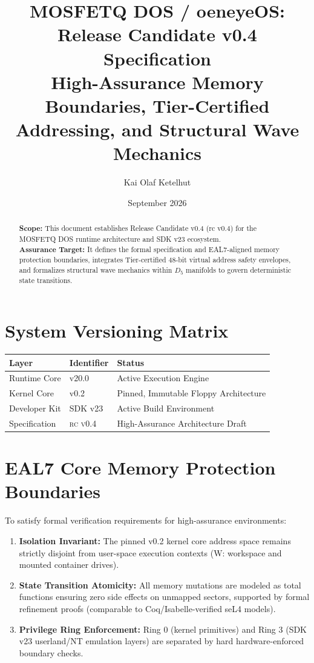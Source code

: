 \documentclass[11pt,a4paper]{article}
\title{MOSFETQ DOS / oeneyeOS: Release Candidate v0.4 Specification \\ \large High-Assurance Memory Boundaries, Tier-Certified Addressing, and Structural Wave Mechanics}
\author{Kai Olaf Ketelhut}
\date{September 2026}
\begin{document}
\maketitle

\begin{abstract}
\noindent \textbf{Scope:} This document establishes Release Candidate v0.4 ($\text{rc v0.4}$) for the MOSFETQ DOS runtime architecture and SDK v23 ecosystem. \\
\textbf{Assurance Target:} It defines the formal specification and EAL7-aligned memory protection boundaries, integrates Tier-certified 48-bit virtual address safety envelopes, and formalizes structural wave mechanics within $D_5$ manifolds to govern deterministic state transitions.
\end{abstract}

\section{System Versioning Matrix}
\begin{table}[h]
\centering
\begin{tabular}{|l|l|l|}
\hline
\textbf{Layer} & \textbf{Identifier} & \textbf{Status} \\ \hline
Runtime Core & v20.0 & Active Execution Engine \\ \hline
Kernel Core & v0.2 & Pinned, Immutable Floppy Architecture \\ \hline
Developer Kit & SDK v23 & Active Build Environment \\ \hline
Specification & \textsc{rc v0.4} & High-Assurance Architecture Draft \\ \hline
\end{tabular}
\end{table}

\section{EAL7 Core Memory Protection Boundaries}
To satisfy formal verification requirements for high-assurance environments:
\begin{enumerate}
    \item \textbf{Isolation Invariant:} The pinned v0.2 kernel core address space remains strictly disjoint from user-space execution contexts ($\text{W:}$ workspace and mounted container drives).
    \item \textbf{State Transition Atomicity:} All memory mutations are modeled as total functions ensuring zero side effects on unmapped sectors, supported by formal refinement proofs (comparable to Coq/Isabelle-verified seL4 models).
    \item \textbf{Privilege Ring Enforcement:} Ring 0 (kernel primitives) and Ring 3 (SDK v23 userland/NT emulation layers) are separated by hard hardware-enforced boundary checks.
\end{enumerate}
\end{document}
